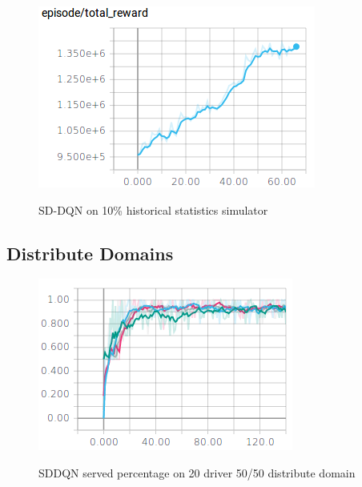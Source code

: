 \begin{figure}[H]
\begin{floatrow}
\centering
\includegraphics[width=1.0\linewidth]{sections/mddqn/figures/score10percent.png}\label{fig:10pscore}


\caption{SD-DQN on 10\% historical statistics simulator}
\end{floatrow}
\end{figure}

\subsection{Distribute Domains}

\begin{figure}[H]
\begin{floatrow}
\centering
\includegraphics[width=1.0\linewidth]{sections/mddqn/figures/SDDQN_bal.png}\label{fig:balancedSD}

\caption{SDDQN served percentage on 20 driver 50/50 distribute domain}
\end{floatrow}
\end{figure}


